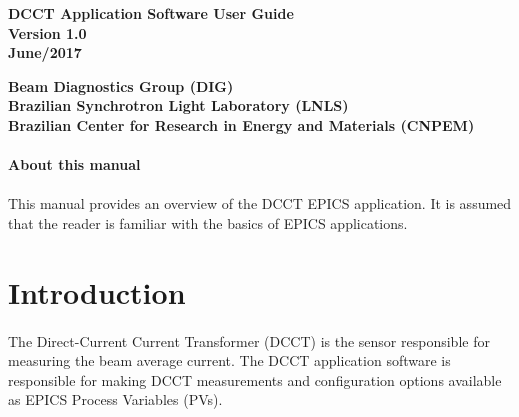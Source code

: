 \documentclass[openany]{article}
\begin{document}
\begin{titlepage}

\thispagestyle{fancy}

\begin{center}

\vspace*{\fill}
\textbf{\Huge DCCT Application Software User Guide}\\[20pt]
\textbf{\Huge Version 1.0}\\[20pt]
\textbf{\Huge June/2017}
\vspace*{\fill}

\vfill
\textbf{Beam Diagnostics Group (DIG)}\\[5pt]
\textbf{Brazilian Synchrotron Light Laboratory (LNLS)}\\[5pt]
\textbf{Brazilian Center for Research in Energy and Materials (CNPEM)}
\end{center}

\end{titlepage}

\newpage
\pagestyle{plain} %

\paragraph{}{\Large\bfseries About this manual}

\paragraph{} This manual provides an overview of the DCCT EPICS application. It is assumed that the reader is familiar with the basics of EPICS applications.

\tableofcontents

\newpage
\section{Introduction}

\paragraph{} The Direct-Current Current Transformer (DCCT) is the sensor responsible for measuring the beam average current. The DCCT application software is responsible for making DCCT measurements and configuration options available as EPICS Process Variables (PVs).
\end{document}
